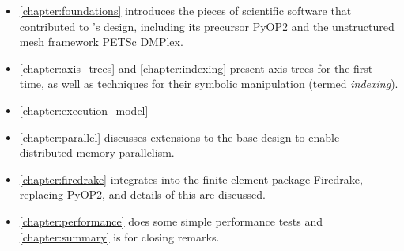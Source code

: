 \documentclass[thesis]{subfiles}
\begin{document}
\begin{itemize}
  \item
    \cref{chapter:foundations} introduces the pieces of scientific software that contributed to 's design, including its precursor PyOP2 and the unstructured mesh framework PETSc DMPlex.
  \item
    \cref{chapter:axis_trees} and \cref{chapter:indexing} present axis trees for the first time, as well as techniques for their symbolic manipulation (termed \textit{indexing}).
  \item
    \cref{chapter:execution_model} 
  \item
    \cref{chapter:parallel} discusses extensions to the base design to enable distributed-memory parallelism.
  \item
    \cref{chapter:firedrake} integrates  into the finite element package Firedrake, replacing PyOP2, and details of this are discussed.
  \item
    \cref{chapter:performance} does some simple performance tests and \cref{chapter:summary} is for closing remarks.
\end{itemize}


\end{document}
